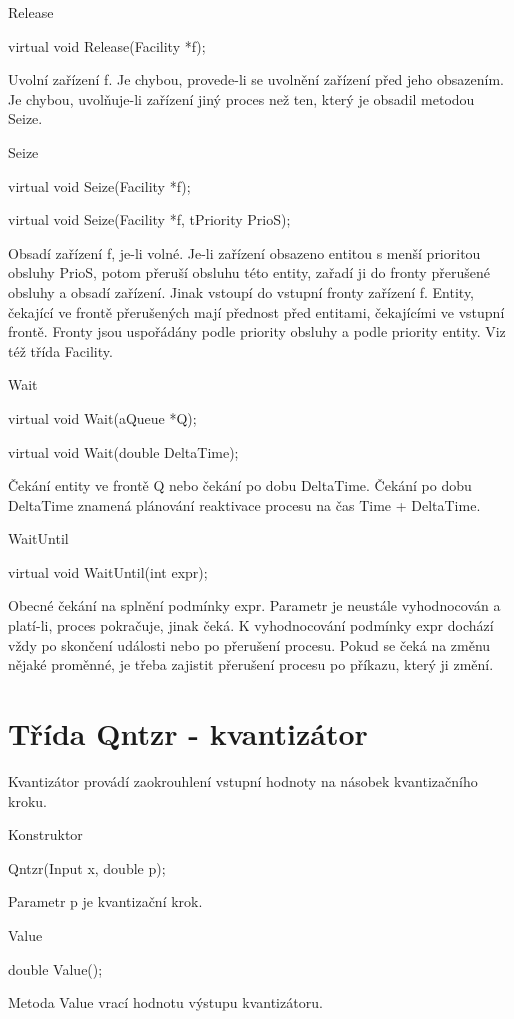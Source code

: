 \documentclass[a4paper]{article}
\begin{document}
Release

  virtual void Release(Facility *f);


Uvolní zařízení f. Je chybou, provede-li se uvolnění zařízení
před jeho obsazením. Je chybou, uvolňuje-li zařízení jiný proces
než ten, který je obsadil metodou Seize.


Seize

  virtual void Seize(Facility *f);

  virtual void Seize(Facility *f, tPriority PrioS);


Obsadí zařízení f, je-li volné. Je-li zařízení obsazeno
entitou s menší prioritou obsluhy PrioS, potom přeruší obsluhu
této entity, zařadí ji do fronty přerušené obsluhy a obsadí zařízení.
Jinak vstoupí do vstupní fronty zařízení f. Entity, čekající
ve frontě přerušených mají přednost před entitami, čekajícími ve
vstupní frontě. Fronty jsou uspořádány podle priority obsluhy a podle
priority entity. Viz též třída Facility.


Wait

  virtual void Wait(aQueue *Q);

  virtual void Wait(double DeltaTime);


Čekání entity ve frontě Q nebo čekání po dobu DeltaTime.
Čekání po dobu DeltaTime znamená plánování reaktivace procesu
na čas Time + DeltaTime.


WaitUntil

  virtual void WaitUntil(int expr);


Obecné čekání na splnění podmínky expr. Parametr je neustále
vyhodnocován a platí-li, proces pokračuje, jinak čeká. K vyhodnocování
podmínky expr dochází vždy po skončení události nebo po
přerušení procesu. Pokud se čeká na změnu nějaké proměnné, je třeba
zajistit přerušení procesu po příkazu, který ji změní.

\section{Třída Qntzr - kvantizátor}

Kvantizátor provádí zaokrouhlení vstupní hodnoty na násobek kvantizačního
kroku.


Konstruktor

  Qntzr(Input x, double p);


Parametr p je kvantizační krok.


Value

  double Value();


Metoda Value vrací hodnotu výstupu kvantizátoru.
\end{document}
